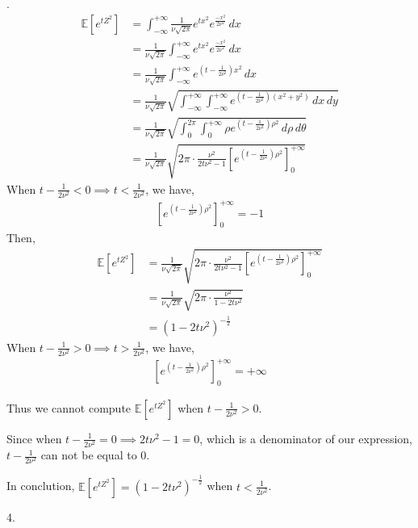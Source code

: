 .
\begin{align}
    \nonumber \mathbb{E}\left[ e^{tZ^2} \right]&=\int_{-\infty }^{+\infty }\frac{1}{\nu \sqrt{2\pi}}e^{tx^2}e^{\frac{-x^2}{2\nu ^2}}\,dx\\
    \nonumber &=\frac{1}{\nu \sqrt{2\pi}}\int_{-\infty }^{+\infty }e^{tx^2}e^{\frac{-x^2}{2\nu^2}}\,dx\\
    \nonumber &=\frac{1}{\nu \sqrt{2\pi}}\int_{-\infty }^{+\infty }e^{(t-\frac{1}{2\nu^2})x^2}\,dx\\
    \nonumber &=\frac{1}{\nu \sqrt{2\pi}}\sqrt{\int_{-\infty }^{+\infty }\int_{-\infty }^{+\infty }e^{(t-\frac{1}{2\nu^2})(x^2+y^2)}\,dx\,dy}\\
    \nonumber &=\frac{1}{\nu \sqrt{2\pi}}\sqrt{ \int_{0}^{2\pi}\int_{0 }^{+\infty }\rho e^{(t-\frac{1}{2\nu^2})\rho^2}\,d\rho\,d\theta   }\\
    \nonumber &=\frac{1}{\nu \sqrt{2\pi}}\sqrt{ 2\pi\cdot\frac{\nu^2}{2t\nu^2-1}\left[e^{ (t-\frac{1}{2\nu^2})\rho^2}\right]_{0}^{+\infty} }
\end{align}
When $t-\frac{1}{2\nu^2}<0\implies t<\frac{1}{2\nu^2}$, we have,
\begin{align}
    \nonumber \left[e^{ (t-\frac{1}{2\nu^2})\rho^2}\right]_{0}^{+\infty}=-1
\end{align}
Then,
\begin{align}
    \nonumber \mathbb{E}\left[ e^{tZ^2} \right]&=\frac{1}{\nu \sqrt{2\pi}}\sqrt{ 2\pi\cdot\frac{\nu^2}{2t\nu^2-1}\left[e^{ (t-\frac{1}{2\nu^2})\rho^2}\right]_{0}^{+\infty} }\\
    \nonumber &=\frac{1}{\nu \sqrt{2\pi}}\sqrt{2\pi\cdot\frac{\nu^2}{1-2t\nu^2}}\\
    \nonumber &=(1-2t\nu^2)^{-\frac{1}{2}}
\end{align}
When $t-\frac{1}{2\nu^2}>0\implies t>\frac{1}{2\nu^2}$, we have,
\begin{align}
    \nonumber \left[e^{ (t-\frac{1}{2\nu^2})\rho^2}\right]_{0}^{+\infty}=+\infty
\end{align}

Thus we cannot compute $\mathbb{E}\left[ e^{tZ^2} \right]$ when $t-\frac{1}{2\nu^2}>0$.

Since when $t-\frac{1}{2\nu^2}=0 \implies 2t\nu^2-1=0$, which is a  denominator of our expression, $t-\frac{1}{2\nu^2}$ can not be equal to $0$.

In conclution, $\mathbb{E}\left[ e^{tZ^2} \right]=(1-2t\nu^2)^{-\frac{1}{2}}$ when $t<\frac{1}{2\nu^2}$.

4.\\

